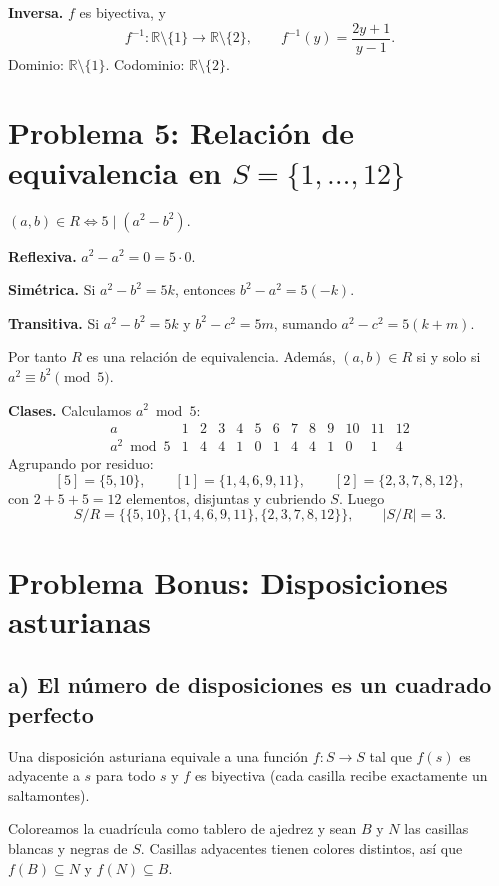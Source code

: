 \documentclass[11pt]{article}
\newcommand{\R}{\mathbb{R}}
\begin{document}
\textbf{Inversa.} $f$ es biyectiva, y
\[
f^{-1}:\R\setminus\{1\}\to\R\setminus\{2\},\qquad f^{-1}(y)=\frac{2y+1}{y-1}.
\]
Dominio: $\R\setminus\{1\}$. Codominio: $\R\setminus\{2\}$.

\section*{Problema 5: Relación de equivalencia en $S=\{1,\dots,12\}$}

$(a,b)\in R\iff 5\mid (a^2-b^2)$.

\textbf{Reflexiva.} $a^2-a^2=0=5\cdot 0$.

\textbf{Simétrica.} Si $a^2-b^2=5k$, entonces $b^2-a^2=5(-k)$.

\textbf{Transitiva.} Si $a^2-b^2=5k$ y $b^2-c^2=5m$, sumando $a^2-c^2=5(k+m)$.

Por tanto $R$ es una relación de equivalencia. Además, $(a,b)\in R$ si y solo si $a^2\equiv b^2 \pmod 5$.

\textbf{Clases.} Calculamos $a^2 \bmod 5$:
\[
\begin{array}{c|cccccccccccc}
a & 1&2&3&4&5&6&7&8&9&10&11&12\\\hline
a^2 \bmod 5 & 1&4&4&1&0&1&4&4&1&0&1&4
\end{array}
\]
Agrupando por residuo:
\[
[5]=\{5,10\},\qquad [1]=\{1,4,6,9,11\},\qquad [2]=\{2,3,7,8,12\},
\]
con $2+5+5=12$ elementos, disjuntas y cubriendo $S$. Luego
\[
S/R=\bigl\{\{5,10\},\{1,4,6,9,11\},\{2,3,7,8,12\}\bigr\},\qquad |S/R|=3.
\]

\section*{Problema Bonus: Disposiciones asturianas}

\subsection*{a) El número de disposiciones es un cuadrado perfecto}

Una disposición asturiana equivale a una función $f:S\to S$ tal que $f(s)$ es adyacente a $s$ para todo $s$ y $f$ es biyectiva (cada casilla recibe exactamente un saltamontes).

Coloreamos la cuadrícula como tablero de ajedrez y sean $B$ y $N$ las casillas blancas y negras de $S$. Casillas adyacentes tienen colores distintos, así que $f(B)\subseteq N$ y $f(N)\subseteq B$.
\end{document}
